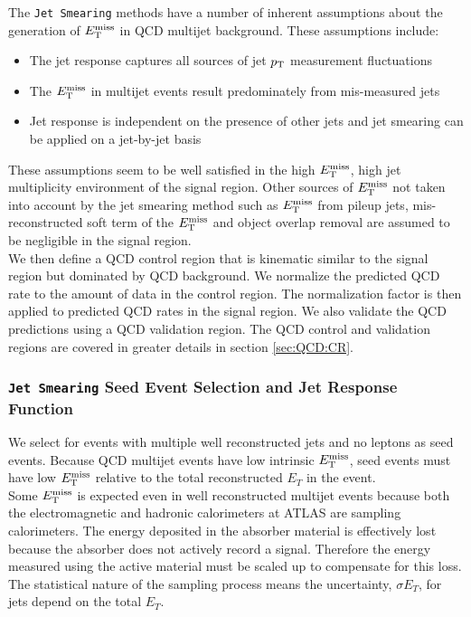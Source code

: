 \indent The {\tt Jet Smearing} methods have a number of inherent assumptions about the generation of $E_{\mathrm{T}}^{\mathrm{miss}}$ in QCD multijet background.  These assumptions include: \\

\begin{itemize}
\item The jet response captures all sources of jet $p_{\mathrm{T}}$ measurement fluctuations
\item The $E_{\mathrm{T}}^{\mathrm{miss}}$ in multijet events result predominately from mis-measured jets
\item Jet response is independent on the presence of other jets and jet smearing can be applied on a jet-by-jet basis
\end{itemize}

\indent These assumptions seem to be well satisfied in the high $E_{\mathrm{T}}^{\mathrm{miss}}$, high jet multiplicity environment of the signal region.  Other sources of $E_{\mathrm{T}}^{\mathrm{miss}}$ not taken into account by the jet smearing method such as $E_{\mathrm{T}}^{\mathrm{miss}}$ from pileup jets, mis-reconstructed soft term of the $E_{\mathrm{T}}^{\mathrm{miss}}$ and object overlap removal are assumed to be negligible in the signal region. \\

\indent We then define a QCD control region that is kinematic similar to the signal region but dominated by QCD background.  We normalize the predicted QCD rate to the amount of data in the control region.  The normalization factor is then applied to predicted QCD rates in the signal region.  We also validate the QCD predictions using a QCD validation region.  The QCD control and validation regions are covered in greater details in section \ref{sec:QCD:CR}. \\

\subsubsection{{\tt Jet Smearing} Seed Event Selection and Jet Response Function}

\indent We select for events with multiple well reconstructed jets and no leptons as seed events.  Because QCD multijet events have low intrinsic $E_{\mathrm{T}}^{\mathrm{miss}}$, seed events must have low $E_{\mathrm{T}}^{\mathrm{miss}}$ relative to the total reconstructed $E_T$ in the event. \\ 

\indent Some $E_{\mathrm{T}}^{\mathrm{miss}}$ is expected even in well reconstructed multijet events because both the electromagnetic and hadronic calorimeters at ATLAS are sampling calorimeters.  The energy deposited in the absorber material is effectively lost because the absorber does not actively record a signal.  Therefore the energy measured using the active material must be scaled up to compensate for this loss.  The statistical nature of the sampling process means the uncertainty, $\sigma E_T$, for jets depend on the total $E_T$.   \\

